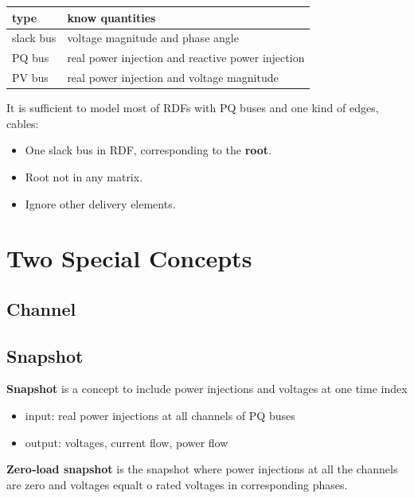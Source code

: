 \documentclass[
]{book}
\providecommand{\tightlist}{%
  \setlength{\itemsep}{0pt}\setlength{\parskip}{0pt}}
\begin{document}
\begin{table}[H]
\centering
\begin{tabular}[t]{l|l}
\hline
type & know quantities\\
\hline
slack bus & voltage magnitude and phase angle\\
\hline
PQ bus & real power injection and reactive power injection\\
\hline
PV bus & real power injection and voltage magnitude\\
\hline
\end{tabular}
\end{table}

It is sufficient to model most of RDFs with PQ buses and one kind of edges,
cables:

\begin{itemize}
\tightlist
\item
  One slack bus in RDF, corresponding to the \textbf{root}.
\item
  Root not in any matrix.
\item
  Ignore other delivery elements.
\end{itemize}

\hypertarget{two-special-concepts}{%
\chapter{Two Special Concepts}\label{two-special-concepts}}

\hypertarget{channel}{%
\section{Channel}\label{channel}}

\hypertarget{snapshot}{%
\section{Snapshot}\label{snapshot}}

\textbf{Snapshot} is a concept to include power injections and voltages at one time
index

\begin{itemize}
\tightlist
\item
  input: real power injections at all channels of PQ buses
\item
  output: voltages, current flow, power flow
\end{itemize}

\textbf{Zero‐load snapshot} is the snapshot where power injections at all the
channels are zero and voltages equalt o rated voltages in corresponding phases.
\end{document}
